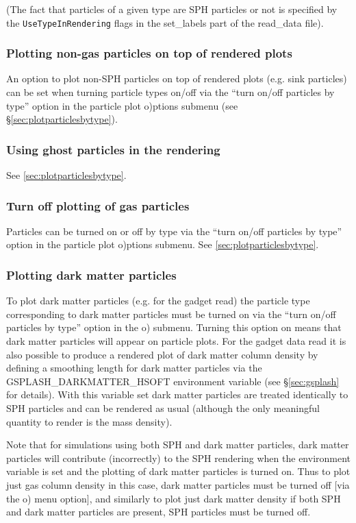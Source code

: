 \documentclass[a4paper,11pt]{article}
\begin{document}
 (The fact that particles of a given type are SPH particles or not is specified by the \verb+UseTypeInRendering+
flags in the set\_labels part of the read\_data file).

\subsubsection{ Plotting non-gas particles on top of rendered plots}
 An option to plot non-SPH particles on top of rendered plots (e.g. sink particles) can be set when turning particle types on/off via the ``turn on/off particles by type'' option in the particle plot o)ptions submenu (see \S\ref{sec:plotparticlesbytype}).

\subsubsection{ Using ghost particles in the rendering}
 See \ref{sec:plotparticlesbytype}.

\subsubsection{ Turn off plotting of gas particles}
 Particles can be turned on or off by type via the ``turn on/off particles by type'' option in the particle plot o)ptions submenu. See \ref{sec:plotparticlesbytype}. 

\subsubsection{ Plotting dark matter particles}
\label{sec:darkmatter}
 To plot dark matter particles (e.g. for the gadget read) the particle type corresponding to dark matter particles must be turned on via the ``turn on/off particles by type'' option in the o) submenu. Turning this option on means that dark matter particles will appear on particle plots. For the gadget data read it is also possible to produce a rendered plot of dark matter column density by defining a smoothing length for dark matter particles via the GSPLASH\_DARKMATTER\_HSOFT environment variable (see \S\ref{sec:gsplash} for details). With this variable set dark matter particles are treated identically to SPH particles and can be rendered as usual (although the only meaningful quantity to render is the mass density).
 
  Note that for simulations using both SPH and dark matter particles, dark matter particles will contribute (incorrectly) to the SPH rendering when the environment variable is set and the plotting of dark matter particles is turned on. Thus to plot just gas column density in this case, dark matter particles must be turned off [via the o) menu option], and similarly to plot just dark matter density if both SPH and dark matter particles are present, SPH particles must be turned off.
 
\end{document}
